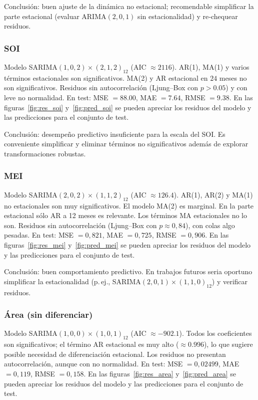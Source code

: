Conclusión: buen ajuste de la dinámica no estacional; recomendable
simplificar la parte estacional (evaluar ARIMA$(2,0,1)$ sin estacionalidad) y re‐chequear
residuos.
\vspace{0.3em}




\subsubsection{SOI}
Modelo SARIMA$(1,0,2)\times(2,1,2)_{12}$ (AIC $\approx 2116$).
AR(1), MA(1) y varios términos estacionales son significativos. MA(2) y AR estacional en
$24$ meses no son significativos. Residuos sin autocorrelación (Ljung--Box con $p>0.05$) y con leve
no normalidad. En test: MSE $=88.00$, MAE $=7.64$, RMSE $=9.38$. En las figuras~\ref{fig:res_soi} y~\ref{fig:pred_soi} se pueden apreciar los residuos del modelo y las predicciones para el conjunto de test.

Conclusión: desempeño predictivo insuficiente para la escala del SOI. Es conveniente simplificar y eliminar términos no significativos además de explorar transformaciones robustas.
\vspace{0.3em}


\subsubsection{MEI}
Modelo SARIMA$(2,0,2)\times(1,1,2)_{12}$ (AIC $\approx 126.4$).
AR(1), AR(2) y MA(1) no estacionales son muy significativos. El modelo MA(2) es marginal. 
En la parte estacional sólo AR a 12 meses es relevante. Los términos MA estacionales no lo son.
Residuos sin autocorrelación (Ljung--Box con $p\approx 0,84$), con colas algo pesadas.
En test: MSE $=0,821$, MAE $=0,725$, RMSE $=0,906$. En las figuras~\ref{fig:res_mei} y~\ref{fig:pred_mei} se pueden apreciar los residuos del modelo y las predicciones para el conjunto de test.

Conclusión: buen comportamiento predictivo. En trabajos futuros seria oportuno simplificar
la estacionalidad (p.\,ej., SARIMA$(2,0,1)\times(1,1,0)_{12}$) y verificar residuos.
\vspace{0.3em}


\subsubsection{Área (sin diferenciar)}
Modelo SARIMA$(1,0,0)\times(1,0,1)_{12}$ 
(AIC $\approx -902.1$). Todos los coeficientes son significativos; el término AR estacional
es muy alto ($\approx 0.996$), lo que sugiere posible necesidad de diferenciación
estacional. Los residuos no presentan autocorrelación, aunque con no normalidad.
En test: MSE $=0,02499$, MAE $=0,119$, RMSE $=0,158$. En las figuras~\ref{fig:res_area} y~\ref{fig:pred_area} se pueden apreciar los residuos del modelo y las predicciones para el conjunto de test.

